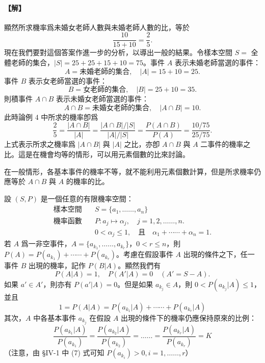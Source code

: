 \paragraph{【解】}
顯然所求機率爲未婚女老師人數與未婚老師人數的比，等於
\[
\frac{10}{15+10} = \frac{2}{5}.
\]
現在我們要對這個答案作進一步的分析，以導出一般的結果。令樣本空間 $S=$ 全體老師的集合，$|S|=25+25+15+10=75$。事件 $A$ 表示未婚老師當選的事件：
\[
A = \text{未婚老師的集合}, \quad |A| = 15+10 = 25.
\]
事件 $B$ 表示女老師當選的事件：
\[
B = \text{女老師的集合}, \quad |B| = 25+10 = 35.
\]
則積事件 $A \cap B$ 表示未婚女老師當選的事件：
\[
A \cap B = \text{未婚女老師的集合}, \quad |A \cap B| = 10.
\]
此時論例 4 中所求的機率卽爲
\[
\frac{2}{5} = \frac{|A \cap B|}{|A|} = \frac{|A \cap B|/|S|}{|A|/|S|} = \frac{P(A \cap B)}{P(A)} = \frac{10/75}{25/75}.
\]
上式表示所求之機率爲 $|A \cap B|$ 與 $|A|$ 之比，亦卽 $A \cap B$ 與 $A$ 二事件的機率之比。這是在機會均等的情形，可以用元素個數的比來討論。

在一般情形，各基本事件的機率不等，就不能利用元素個數計算，但是所求機率仍應等於 $A \cap B$ 與 $A$ 的機率的比。

設 $(S, P)$ 是一個任意的有限機率空間：
\begin{align*}
\text{樣本空間}\quad & S = \{a_1, \dots\dots, a_n\} \\
\text{機率函數}\quad & P : a_j \longmapsto \alpha_j, \quad j = 1, 2, \dots\dots, n. \\
& 0 < \alpha_j \le 1, \quad\text{且}\quad \alpha_1 + \cdots\cdots + \alpha_n = 1.
\end{align*}
若 $A$ 爲一非空事件，$A=\{a_{k_1}, \dots\dots, a_{k_r}\}$，$0 < r \le n$，則 $P(A) = P(a_{k_1}) + \cdots\cdots + P(a_{k_r})$。考慮在假設事件 $A$ 出現的條件之下，任一事件 $B$ 出現的機率，記作 $P(B|A)$。顯然我們有
\[
P(A|A) = 1, \quad P(A'|A) = 0 \quad (A' = S - A).
\]
如果 $a' \in A'$，則亦有 $P(a'|A) = 0$。但是如果 $a_{k_j} \in A$，則 $0 < P(a_{k_j}|A) \le 1$，並且
\begin{equation}\tag{1}\label{eq:b5s-4-1}
1 = P(A|A) = P(a_{k_1}|A) + \cdots\cdots + P(a_{k_r}|A)
\end{equation}
其次，$A$ 中各基本事件 $a_{k_j}$ 在假設 $A$ 出現的條件下的機率仍應保持原來的比例：
\begin{equation}\tag{2}\label{eq:b5s-4-2}
\frac{P(a_{k_1}|A)}{P(a_{k_1})} = \frac{P(a_{k_2}|A)}{P(a_{k_2})} = \dots\dots = \frac{P(a_{k_r}|A)}{P(a_{k_r})} = K
\end{equation}
（注意，由 §IV-1 中 (7) 式可知 $P(a_{k_i}) > 0, i = 1, \dots\dots, r$）

